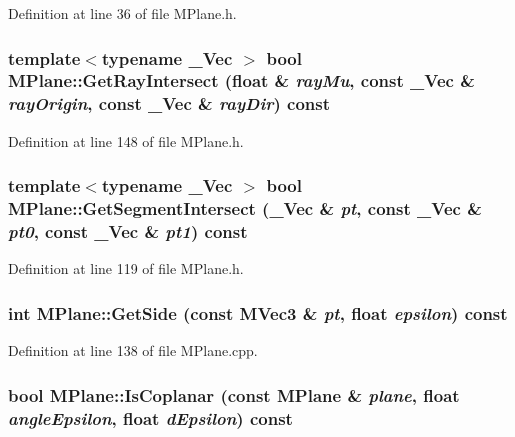 Definition at line 36 of file MPlane.h.\hypertarget{class_m_plane_96c35a2efe09dbd9267d54936ed7d4ba}{
\subsubsection[{GetRayIntersect}]{\setlength{\rightskip}{0pt plus 5cm}template$<$typename \_\-Vec $>$ bool MPlane::GetRayIntersect (float \& {\em rayMu}, \/  const \_\-Vec \& {\em rayOrigin}, \/  const \_\-Vec \& {\em rayDir}) const}}
\label{class_m_plane_96c35a2efe09dbd9267d54936ed7d4ba}




Definition at line 148 of file MPlane.h.\hypertarget{class_m_plane_5f4124f83a2962996c6be87a5d5c92f2}{
\subsubsection[{GetSegmentIntersect}]{\setlength{\rightskip}{0pt plus 5cm}template$<$typename \_\-Vec $>$ bool MPlane::GetSegmentIntersect (\_\-Vec \& {\em pt}, \/  const \_\-Vec \& {\em pt0}, \/  const \_\-Vec \& {\em pt1}) const}}
\label{class_m_plane_5f4124f83a2962996c6be87a5d5c92f2}




Definition at line 119 of file MPlane.h.\hypertarget{class_m_plane_ba18afe95e49cc82c2d1f1feca4f1838}{
\subsubsection[{GetSide}]{\setlength{\rightskip}{0pt plus 5cm}int MPlane::GetSide (const {\bf MVec3} \& {\em pt}, \/  float {\em epsilon}) const}}
\label{class_m_plane_ba18afe95e49cc82c2d1f1feca4f1838}




Definition at line 138 of file MPlane.cpp.\hypertarget{class_m_plane_52a97a802d2b37a8d4755735a406c217}{
\subsubsection[{IsCoplanar}]{\setlength{\rightskip}{0pt plus 5cm}bool MPlane::IsCoplanar (const {\bf MPlane} \& {\em plane}, \/  float {\em angleEpsilon}, \/  float {\em dEpsilon}) const}}
\label{class_m_plane_52a97a802d2b37a8d4755735a406c217}




